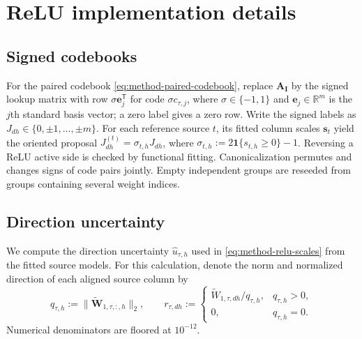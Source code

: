 \section{ReLU implementation details}
\label{app:relu-details}

\subsection{Signed codebooks}
\label{app:relu-signed-codebook}

For the paired codebook \eqref{eq:method-paired-codebook}, replace
$\mathbf A_{\mathbf I}$
by the signed lookup matrix with row $\sigma\mathbf e_j^{\mathsf T}$
for code $\sigma c_{\tau,j}$, where $\sigma\in\{-1,1\}$ and
$\mathbf e_j\in\mathbb R^m$ is the $j$th standard basis vector;
a zero label gives a zero row.
Write the signed labels as $J_{dh}\in\{0,\pm1,\ldots,\pm m\}$.
For each reference source $t$, its fitted column scales
$\mathbf s_t$ yield the oriented proposal
$J^{(t)}_{dh}=\sigma_{t,h}J_{dh}$, where
$\sigma_{t,h}:=2\mathbf1\{s_{t,h}\ge0\}-1$.
Reversing a ReLU active side is checked by functional fitting.
Canonicalization permutes and changes signs of code pairs jointly.
Empty independent groups are reseeded from groups containing several
weight indices.

\subsection{Direction uncertainty}
\label{app:relu-uncertainty}

We compute the direction uncertainty $\widehat u_{\tau,h}$ used in
\eqref{eq:method-relu-scales} from the fitted source models.
For this calculation, denote the norm and normalized direction of
each aligned source column by
\begin{equation}
    q_{\tau,h}:=\|\widetilde{\mathbf W}_{1,\tau,:,h}\|_2,
    \qquad
    r_{\tau,dh}:=
    \begin{cases}
        \widetilde W_{1,\tau,dh}/q_{\tau,h}, & q_{\tau,h}>0,\\
        0, & q_{\tau,h}=0.
    \end{cases}
    \label{eq:method-relu-directions}
\end{equation}
Numerical denominators are floored at $10^{-12}$.

